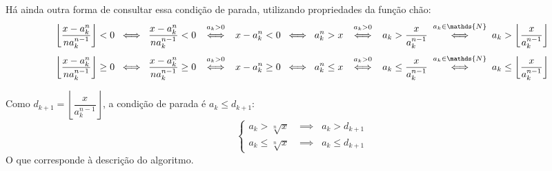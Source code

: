 Há ainda outra forma de consultar essa condição de parada,
utilizando propriedades da função chão:
\[
  \left\lfloor \dfrac{x - a_k^n}{na_k^{n-1}} \right\rfloor < 0
  \;\iff\;
  \dfrac{x - a_k^n}{na_k^{n-1}} < 0
  \;\stackfirst{a_k > 0}{\iff}\;
  x - a_k^n < 0
  \;\iff\;
  a_k^n > x
  \;\stackfirst{a_k > 0}{\iff}\;
  a_k > \dfrac{x}{a_k^{n-1}}
  \;\stackfirst{a_k \in \mathds{N}}{\iff}\;
  a_k > \left\lfloor \dfrac{x}{a_k^{n-1}} \right\rfloor
\]
\[
  \left\lfloor \dfrac{x - a_k^n}{na_k^{n-1}} \right\rfloor \ge 0
  \;\iff\;
  \dfrac{x - a_k^n}{na_k^{n-1}} \ge 0
  \;\stackfirst{a_k > 0}{\iff}\;
  x - a_k^n \ge 0
  \;\iff\;
  a_k^n \le x
  \;\stackfirst{a_k > 0}{\iff}\;
  a_k \le \dfrac{x}{a_k^{n-1}}
  \;\stackfirst{a_k \in \mathds{N}}{\iff}\;
  a_k \le \left\lfloor \dfrac{x}{a_k^{n-1}} \right\rfloor
\]

Como $d_{k+1} = \left\lfloor \dfrac{x}{a_k^{n-1}} \right\rfloor$,
a condição de parada é $a_k \le d_{k+1}$:
\[
\begin{cases}
  a_k > \sqrt[n]{x} &\implies\;\; a_k > d_{k+1} \\
  a_k \le \sqrt[n]{x} &\implies\;\; a_k \le d_{k+1}
\end{cases}
\]
O que corresponde à descrição do algoritmo.
